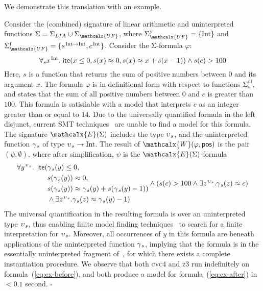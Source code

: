 \documentclass[runningheads,a4paper]{llncs}
\newcommand{\con}[1]{\mathsf{#1}}
\let\oldSigma=\Sigma
\def\Sigma{\mathrm{\oldSigma}}
\newcommand{\cvc}{\textsc{cvc}{\small 4}\xspace}
\newcommand{\ziii}{\textsc{z}{\small 3}\xspace}
\newcommand{\teq}{\approx}
\newcommand{\conv}{\mathcalx{W}}
\newcommand{\ssorts}[1]{#1^\mathrm{y}}
\newcommand{\sfuns}[1]{#1^\mathrm{f}}
\newcommand{\sfundefs}[1]{#1^\mathrm{df}}
\newcommand{\sortint}{\mathrm{Int}}
\newcommand{\ptrue}{\con{pos}}
\newcommand{\lite}{\con{ite}}
\newcommand\concret{\gamma} %
\newcommand{\farg}[1]{\concret_{\vthinspace#1}}
\newcommand{\fargsort}[1]{\upsilon_{\vthinspace#1}}
\newcommand{\Sigmalia}{\Sigma_{LIA}}
\newcommand{\extendsig}[1]{\mathcalx{E}( #1 )}
\newcommand{\vthinspace}{\kern+0.083333em}
\newcommand{\typ}[1]{^{\vthinspace #1}}
\newcommand{\euf}{\ensuremath{\mathcalx{UF}}\xspace}
\begin{document}
We demonstrate this translation with an example.

\begin{example}
\label{ex:translation}
Consider the (combined) signature of linear arithmetic and uninterpreted functions $\Sigma = \Sigmalia \cup \Sigma_{\euf}$,
where $\ssorts{\Sigma_{\euf}} = \{ \sortint \}$ and 
$\sfuns{\Sigma_{\euf}} = \{ s\typ{ \sortint \rightarrow \sortint }, c\typ{ \sortint } \}$.
Consider the $\Sigma$-formula $\varphi$:
\begin{equation} \label{eq:ex-before}
\forall_{s} x\typ{\sortint}.\; \lite( x \leq 0, s(x) \teq 0, s( x ) \teq x + s( x-1 ) ) \wedge s( c ) > 100
\end{equation} 
%
Here, $s$ is a function that returns the sum of positive numbers between $0$
and its argument $x$. The formula $\varphi$ is in definitional form with
respect to functions $\sfundefs{\Sigma_u}$, and states that the sum of all
positive numbers between $0$ and $c$ is greater than $100$. This formula is
satisfiable with a model that interprets $c$ as an integer greater than or
equal to $14$. Due to the universally quantified formula in the left disjunct,
current SMT techniques~\cite{GeDeM-CAV-09, ReyEtAl-1-RR-13} are unable to find
a model for this formula. The signature $\extendsig{\Sigma}$ includes the type
$\fargsort{s}$, and the uninterpreted function $\farg{s}$ of type $\fargsort{s}
\rightarrow \sortint$. The result of $\conv( \varphi, \ptrue )$ is the pair $(
\psi, \emptyset )$, where after simplification, $\psi$ is the
$\extendsig{\Sigma}$-formula
%
\begin{eqnarray} \label{eq:ex-after}
\begin{split}
\forall y\typ{\fargsort{s}}.\;\, \lite( & \farg{s}( y ) \leq 0,  \\
 & s(\farg{s}( y )) \teq 0, \\
 & s(\farg{s}( y )) \teq \farg{s}( y ) + s( \farg{s}( y )-1 ) ) \\
 & \wedge \exists z\typ{\fargsort{s}}. \farg{s}( z ) \teq \farg{s}( y )-1 )
\end{split}  
\wedge ( s( c ) > 100 \wedge \exists z\typ{\fargsort{s}}. \farg{s}( z ) \teq c )
\end{eqnarray} 
%
The universal quantification in the resulting formula is over an uninterpreted
type $\fargsort{s}$, thus enabling finite model finding
techniques~\cite{ReyEtAl-1-RR-13} to search for a finite interpretation for
$\fargsort{s}$. Moreover, all occurrences of $y$ in this formula are beneath
applications of the uninterpreted function $\farg{s}$, implying that the
formula is in the essentially uninterpreted fragment of~\cite{GeDeM-CAV-09},
for which there exists a complete instantiation procedure. We observe that both
\cvc and \ziii run indefinitely on formula~(\ref{eq:ex-before}), and both
produce a model for formula~(\ref{eq:ex-after}) in $<0.1$ second. $\square$
\end{example}
\end{document}
